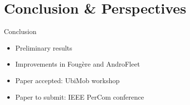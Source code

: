 \section{Conclusion \& Perspectives}

\begin{frame}{Conclusion}
    \begin{itemize}
        \item Preliminary results
        \item Improvements in Foug\`ere and AndroFleet
        \item Paper accepted: UbiMob workshop
        \item Paper to submit: IEEE PerCom conference
    \end{itemize}
\end{frame}